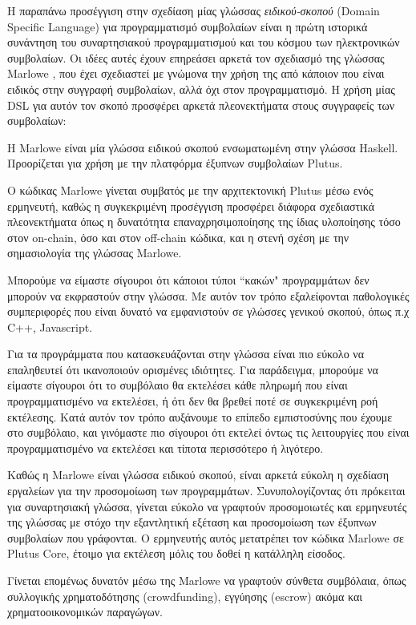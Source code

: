 Η παραπάνω προσέγγιση στην σχεδίαση μίας γλώσσας \emph{ειδικού-σκοπού}  (Domain
Specific Language) για προγραμματισμό συμβολαίων είναι η πρώτη ιστορικά
συνάντηση του συναρτησιακού προγραμματισμού και του κόσμου των ηλεκτρονικών
συμβολαίων.  Οι ιδέες αυτές έχουν επηρεάσει αρκετά τον σχεδιασμό της γλώσσας
Marlowe \cite{marlowe}, που έχει σχεδιαστεί με γνώμονα την χρήση της από
κάποιον που είναι ειδικός στην συγγραφή συμβολαίων, αλλά όχι στον
προγραμματισμό. Η χρήση μίας DSL για αυτόν τον σκοπό προσφέρει αρκετά
πλεονεκτήματα στους συγγραφείς των συμβολαίων:

Η Marlowe είναι μία γλώσσα ειδικού σκοπού ενσωματωμένη στην γλώσσα Haskell.
Προορίζεται για χρήση με την πλατφόρμα έξυπνων συμβολαίων Plutus.

Ο κώδικας Marlowe γίνεται συμβατός με την αρχιτεκτονική Plutus μέσω ενός
ερμηνευτή, καθώς η συγκεκριμένη προσέγγιση προσφέρει διάφορα σχεδιαστικά
πλεονεκτήματα όπως η δυνατότητα επαναχρησιμοποίησης της ίδιας υλοποίησης τόσο
στον on-chain, όσο και στον off-chain κώδικα, και η στενή σχέση με την
σημασιολογία της γλώσσας Marlowe.

Μπορούμε να είμαστε σίγουροι ότι κάποιοι τύποι ``κακών" προγραμμάτων δεν
μπορούν να εκφραστούν στην γλώσσα. Με αυτόν τον τρόπο εξαλείφονται παθολογικές
συμπεριφορές που είναι δυνατό να εμφανιστούν σε γλώσσες γενικού σκοπού, όπως
π.χ C++, Javascript.

Για τα προγράμματα που κατασκευάζονται στην γλώσσα είναι πιο εύκολο να
επαληθευτεί ότι ικανοποιούν ορισμένες ιδιότητες. Για παράδειγμα, μπορούμε να
είμαστε σίγουροι ότι το συμβόλαιο θα εκτελέσει κάθε πληρωμή που είναι
προγραμματισμένο να εκτελέσει, ή ότι δεν θα βρεθεί ποτέ σε συγκεκριμένη ροή
εκτέλεσης. Κατά αυτόν τον τρόπο αυξάνουμε το επίπεδο εμπιστοσύνης που έχουμε
στο συμβόλαιο, και γινόμαστε πιο σίγουροι ότι εκτελεί όντως τις λειτουργίες που
είναι προγραμματισμένο να εκτελέσει και τίποτα περισσότερο ή λιγότερο.

Καθώς η Marlowe είναι γλώσσα ειδικού σκοπού, είναι αρκετά εύκολη η σχεδίαση
εργαλείων για την προσομοίωση των προγραμμάτων. Συνυπολογίζοντας ότι πρόκειται
για συναρτησιακή γλώσσα, γίνεται εύκολο να γραφτούν προσομοιωτές και ερμηνευτές
της γλώσσας με στόχο την εξαντλητική εξέταση και προσομοίωση των έξυπνων
συμβολαίων που γράφονται. Ο ερμηνευτής αυτός μετατρέπει τον κώδικα Marlowe σε
Plutus Core, έτοιμο για εκτέλεση μόλις του δοθεί η κατάλληλη είσοδος.

Γίνεται επομένως δυνατόν μέσω της Marlowe να γραφτούν σύνθετα συμβόλαια, όπως
συλλογικής χρηματοδότησης (crowdfunding), εγγύησης (escrow) ακόμα και
χρηματοοικονομικών παραγώγων.

